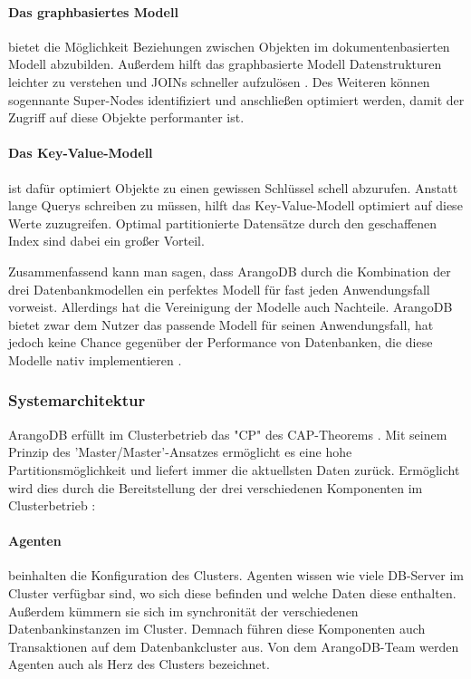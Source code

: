\paragraph{Das graphbasiertes Modell} bietet die Möglichkeit Beziehungen zwischen Objekten im dokumentenbasierten Modell abzubilden. Außerdem hilft das graphbasierte Modell Datenstrukturen leichter zu verstehen und JOINs schneller aufzulösen \cite{AWS_graph}. Des Weiteren können sogennante Super-Nodes identifiziert und anschließen optimiert werden, damit der Zugriff auf diese Objekte performanter ist.

\paragraph{Das Key-Value-Modell} ist dafür optimiert Objekte zu einen gewissen Schlüssel schell abzurufen.  Anstatt lange Querys schreiben zu müssen, hilft das Key-Value-Modell optimiert auf diese Werte zuzugreifen. Optimal partitionierte Datensätze durch den geschaffenen Index sind dabei ein großer Vorteil. \cite{AWS_keyvalue}

Zusammenfassend kann man sagen, dass ArangoDB durch die Kombination der drei Datenbankmodellen ein perfektes Modell für fast jeden Anwendungsfall vorweist. Allerdings hat die Vereinigung der Modelle auch Nachteile. ArangoDB bietet zwar dem Nutzer das passende Modell für seinen Anwendungsfall, hat jedoch keine Chance gegenüber der Performance von Datenbanken, die diese Modelle nativ implementieren \cite{ADB_benchmark}.

\subsubsection{Systemarchitektur}
ArangoDB erfüllt im Clusterbetrieb das "CP" des CAP-Theorems \cite{CAP}. Mit seinem Prinzip des 'Master/Master'-Ansatzes ermöglicht es eine hohe Partitionsmöglichkeit und liefert immer die aktuellsten Daten zurück. Ermöglicht wird dies durch die Bereitstellung der drei verschiedenen Komponenten im Clusterbetrieb \cite{ADB_clusterarch}:
\paragraph{Agenten} 
beinhalten die Konfiguration des Clusters. Agenten wissen wie viele DB-Server im Cluster verfügbar sind, wo sich diese befinden und welche Daten diese enthalten. Außerdem kümmern sie sich im synchronität der verschiedenen Datenbankinstanzen im Cluster. Demnach führen diese Komponenten auch Transaktionen auf dem Datenbankcluster aus. Von dem ArangoDB-Team werden Agenten auch als Herz des Clusters bezeichnet. \cite{ADB_clusterarch}
